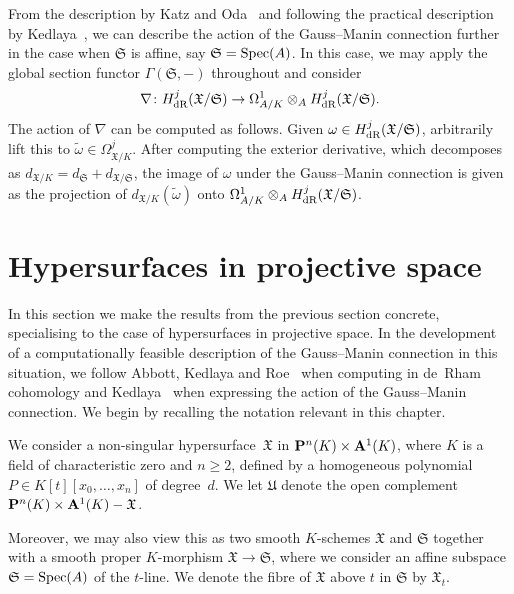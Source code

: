 \begin{rem}
From the description by Katz and Oda~\citep{KatzOda1968} and following the 
practical description by Kedlaya~\citep{Kedlaya2008}, we can describe the 
action of the Gauss--Manin connection further in the case when $\mathfrak{S}$ 
is affine, say $\mathfrak{S} = \operatorname{Spec}(A)$.  In this case, we may apply the 
global section functor $\Gamma(\mathfrak{S}, -)$ throughout and consider
\begin{equation*}
\nabla \colon H_{\text{dR}}^j(\mathfrak{X}/\mathfrak{S}) \rightarrow 
    \Omega_{A/K}^1 \otimes_{A} H_{\text{dR}}^j(\mathfrak{X}/\mathfrak{S}).
\end{equation*}
The action of $\nabla$ can be computed as follows.  Given 
$\omega \in H_{\text{dR}}^j(\mathfrak{X}/\mathfrak{S})$, arbitrarily lift this to 
$\tilde{\omega} \in \Omega_{\mathfrak{X}/K}^j$.  After computing the 
exterior derivative, which decomposes as 
$d_{\mathfrak{X}/K} = d_{\mathfrak{S}} + d_{\mathfrak{X}/\mathfrak{S}}$, 
the image of $\omega$ under the Gauss--Manin connection is given as 
the projection of $d_{\mathfrak{X}/K}(\tilde{\omega})$ onto 
$\Omega_{A/K}^1 \otimes_{A} H_{\text{dR}}^j(\mathfrak{X}/\mathfrak{S})$.
\end{rem}


\section{Hypersurfaces in projective space}
\label{sec:01-04-hypersurfaces}

In this section we make the results from the previous section concrete, 
specialising to the case of hypersurfaces in projective space.  In the 
development of a computationally feasible description of the Gauss--Manin 
connection in this situation, we follow Abbott, Kedlaya and 
Roe~\citep[\S 3.2]{AbbottKedlayaRoe2006} when computing in 
de~Rham cohomology and Kedlaya~\citep[\S 3.2]{Kedlaya2008} when 
expressing the action of the Gauss--Manin connection.  We begin by recalling 
the notation relevant in this chapter.

\begin{notation} \label{not:01-04-main}
We consider a non-singular hypersurface~$\mathfrak{X}$ in 
$\mathbf{P}^n(K) \times \mathbf{A}^1(K)$, where $K$ is a field of characteristic 
zero and $n \geq 2$, defined by a homogeneous polynomial 
$P \in K[t][x_0, \dotsc, x_n]$ of degree~$d$.  We let $\mathfrak{U}$ denote 
the open complement $\mathbf{P}^n(K) \times \mathbf{A}^1(K) - \mathfrak{X}$.

Moreover, we may also view this as two smooth $K$-schemes 
$\mathfrak{X}$ and $\mathfrak{S}$ together with a smooth proper 
$K$-morphism $\mathfrak{X} \to \mathfrak{S}$, where we consider 
an affine subspace $\mathfrak{S} = \operatorname{Spec}(A)$ of the $t$-line.  
We denote the fibre of $\mathfrak{X}$ above $t$ in $\mathfrak{S}$ 
by $\mathfrak{X}_t$.
\end{notation}

